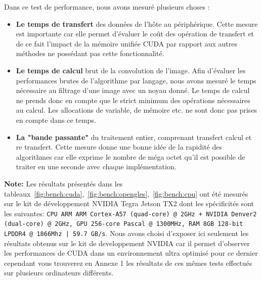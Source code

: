 Dans ce test de performance, nous avons mesuré plusieurs choses :
\begin{itemize}
\item \textbf{Le temps de transfert} des données de l'hôte au périphérique. Cette mesure est importante car elle permet d'évaluer le coût des opération de transfert et de ce fait l'impact de la mémoire unifiée CUDA par rapport aux autres méthodes ne possédant pas cette fonctionnalité.
\item \textbf{Le temps de calcul} brut de la convolution de l'image. Afin d'évaluer les performances brutes de l'algorithme par langage, nous avons mesuré le temps nécessaire au filtrage d'une image avec un noyau donné. Le temps de calcul ne prends donc en compte que le strict minimum des opérations nécessaires au calcul. Les allocations de variable, de mémoire etc. ne sont donc pas prises en compte dans ce temps.
\item \textbf{La "bande passante"} du traitement entier, comprenant transfert calcul et re transfert. Cette mesure donne une bonne idée de la rapidité des algorithmes car elle exprime le nombre de méga octet qu'il est possible de traiter en une seconde avec chaque implémentation.
\end{itemize}

\textbf{Note:} Les résultats présentés dans les tableaux~\ref{fig:bench:cuda},~\ref{fig:bench:opengles},~\ref{fig:bench:cpu} ont été mesurés sur le kit de développement NVIDIA Tegra Jetson TX2 dont les spécificités sont les suivantes: \texttt{CPU ARM ARM Cortex-A57 (quad-core) @ 2GHz + NVIDIA Denver2 (dual-core) @ 2GHz, GPU 256-core Pascal @ 1300MHz, RAM 8GB 128-bit LPDDR4 @ 1866Mhz |  59.7 GB/s}. Nous avons choisi d'exposer ici seulement les résultats obtenus sur le kit de developpement NVIDIA car il permet d'observer les performances de CUDA dans un environnement ultra optimisé pour ce dernier cependant vous trouverez en Annexe 1 les résultats de ces mêmes tests effectués sur plusieurs ordinateurs différents.

